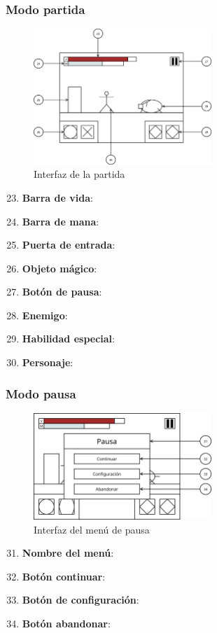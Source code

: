 \subsubsection{Modo partida}
\begin{figure}[H]
    \centering
    \includegraphics[width=0.6\textwidth]{5-Cuerpo/Chapter5/I6.png} %
    \caption{Interfaz de la partida}
    \label{fig:Interface_Partida}
\end{figure}
\begin{enumerate}\setcounter{enumi}{22}
    \item \textbf{Barra de vida}:
    \item \textbf{Barra de mana}:
    \item \textbf{Puerta de entrada}:
    \item \textbf{Objeto mágico}:
    \item \textbf{Botón de pausa}:
    \item \textbf{Enemigo}:
    \item \textbf{Habilidad especial}:
    \item \textbf{Personaje}:
\end{enumerate}

\subsubsection{Modo pausa}
\begin{figure}[H]
    \centering
    \includegraphics[width=0.6\textwidth]{5-Cuerpo/Chapter5/I7.png} %
    \caption{Interfaz del menú de pausa}
    \label{fig:Interface_Pausa}
\end{figure}
\begin{enumerate}\setcounter{enumi}{30}
    \item \textbf{Nombre del menú}:
    \item \textbf{Botón continuar}:
    \item \textbf{Botón de configuración}:
    \item \textbf{Botón abandonar}:
\end{enumerate}

